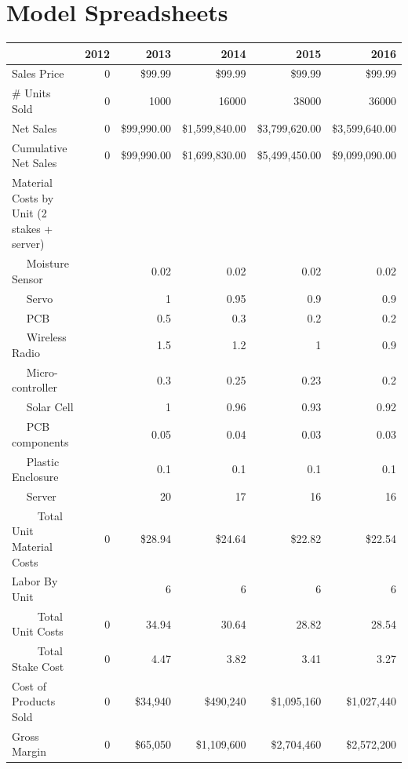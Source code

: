 \documentclass[11pt]{article}
\begin{document}
\section{Model Spreadsheets}


\begin{table}
\begin{tabular}{l||r|r|r|r|r}
&2012&2013&2014&2015&2016\\
 \hline 
Sales Price &0&\$99.99 &\$99.99 &\$99.99 &\$99.99 \\
\# Units Sold &0&1000&16000&38000&36000\\
\hline
Net Sales &0&\$99,990.00 &\$1,599,840.00 &\$3,799,620.00 &\$3,599,640.00 \\
\hline 
Cumulative Net Sales &0&\$99,990.00 &\$1,699,830.00 &\$5,499,450.00 &\$9,099,090.00 \\
\hline
Material Costs by Unit (2 stakes + server)&  &  &  &  &\\
~~ Moisture Sensor &  &0.02&0.02&0.02&0.02\\
~~ Servo &  &1&0.95&0.9&0.9\\
~~ PCB &  &0.5&0.3&0.2&0.2\\
~~ Wireless Radio &  &1.5&1.2&1&0.9\\
~~ Micro-controller &  &0.3&0.25&0.23&0.2\\
~~ Solar Cell &  &1&0.96&0.93&0.92\\
~~ PCB components &  &0.05&0.04&0.03&0.03\\
~~ Plastic Enclosure &&0.1&0.1&0.1&0.1\\
~~ Server &  &20 &17&16&16\\
~~~~ Total Unit Material Costs &0&\$28.94 &\$24.64 &\$22.82 &\$22.54 \\
Labor By Unit &  &6&6&6&6\\
~~~~ Total Unit Costs &0& 34.94&30.64&28.82&28.54\\
~~~~ Total Stake Cost&0&4.47&3.82&3.41&3.27\\
\hline 
Cost of Products Sold &0&\$34,940&\$490,240&\$1,095,160&\$1,027,440\\
Gross Margin &0&\$65,050 &\$1,109,600 &\$2,704,460 &\$2,572,200 \\

\end{tabular}
\end{table}
\end{document}
